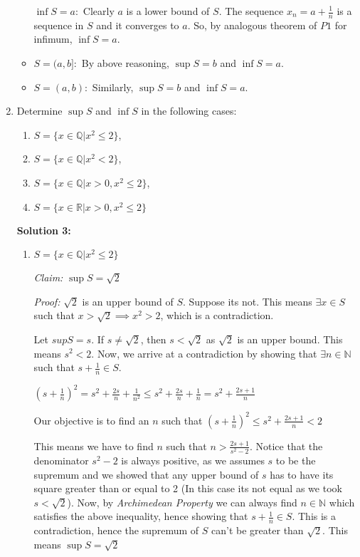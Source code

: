 \documentclass[11pt]{amsart}
\newcommand{\bbQ}{\mathbb{Q}}
\newcommand{\bbR}{\mathbb{R}}
\newcommand{\bbN}{\mathbb{N}}
\theoremstyle{definition}
\begin{document}
\begin{enumerate}[wide, labelwidth=!, labelindent=0pt]
\begin{itemize}
$\inf S = a:$ Clearly $a$ is a lower bound of $S$. The sequence $x_n = a+\frac{1}{n}$ is a sequence in $S$ and it converges to $a$. So, by analogous theorem of $P1$ for infimum, $\inf S = a$.

\item $S=(a,b]:$ By above reasoning, $\sup S = b$ and $\inf S = a$.
\item $S=(a,b):$ Similarly, $\sup S = b$ and $\inf S = a$.
\end{itemize}


\item Determine $\sup S$ and $\inf S$ in the following cases: 
\begin{enumerate}[label=(\alph*)]
\item $S=\{x \in \bbQ|x^2 \le 2\}$,
\item $S=\{x \in \bbQ|x^2 < 2\}$,
\item $S=\{x \in \bbQ|x > 0, x^2 \le 2\}$,
\item $S=\{x \in \bbR|x > 0, x^2 \le 2\}$
\end{enumerate}

\textbf{Solution 3:}

\begin{enumerate}[label=(\alph*)]
\item $S=\{x \in \bbQ|x^2 \le 2\}$

\textit{Claim:} $\sup S = \sqrt{2}$

\textit{Proof:} $\sqrt{2}$ is an upper bound of $S$. Suppose its not. This means $\exists x \in S$ such that $x > \sqrt{2} \implies x^2 > 2$, which is a contradiction.

Let $sup S = s$. If $s \ne \sqrt{2}$, then $s < \sqrt{2}$ as $\sqrt{2}$ is an upper bound. This means $s^2 < 2$.
Now, we arrive at a contradiction by showing that $\exists n \in \bbN$ such that $s + \frac{1}{n} \in S$.

$(s + \frac{1}{n})^2 = s^2 + \frac{2s}{n} + \frac{1}{n^2} \le s^2 + \frac{2s}{n} + \frac{1}{n} = s^2 + \frac{2s+1}{n}$

Our objective is to find an $n$ such that $(s + \frac{1}{n})^2 \le s^2 + \frac{2s+1}{n} < 2$

This means we have to find $n$ such that $n > \frac{2s+1}{s^2-2}$. Notice that the denominator $s^2 - 2$ is always positive, as we assumes $s$ to be the supremum and we showed that any upper bound of $s$ has to have its square greater than or equal to 2 (In this case its not equal as we took $s < \sqrt{2}$). Now, by \textit{Archimedean Property} we can always find $n \in \bbN$ which satisfies the above inequality, hence showing that $s+\frac{1}{n} \in S$. This is a contradiction, hence the supremum of $S$ can't be greater than $\sqrt{2}$. This means $\sup S = \sqrt{2}$


\end{enumerate}
\end{enumerate}
\end{document}
